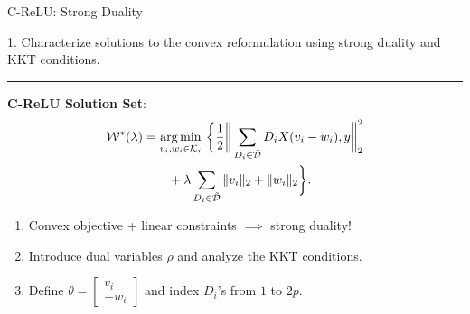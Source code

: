 \documentclass[usenames,dvipsnames,mathserif,notheorems]{beamer}
\newcommand{\horizontalrule}{
	{
			\vspace{-0.5em}
			\center \rule{\textwidth}{0.1em}
			\vspace{-0.2em}
		}
}
\newcommand{\good}[1]{\textcolor{good}{#1}}
\begin{document}
\begin{frame}{C-ReLU: Strong Duality}

	{\raggedright
		\large
		1. Characterize solutions to the \good{convex reformulation}
		using strong duality and KKT conditions.
		\vspace{3ex}
		\pause
	}

	\horizontalrule

	\textbf{C-ReLU Solution Set}:
	\[
		\begin{aligned}
			\mathcal{W}^*(\lambda) & =
			\mathop{\rm arg\,min}_{v_i, w_i \in \mathcal{K}_i} \, \bigg\{
			\frac 1 2 \bigg\|\sum_{D_i \in \tilde {\mathcal{D}}} D_i X (v_i - w_i), y\bigg\|_2^2                    \\
			                & \quad \quad + \lambda\sum_{D_i \in \tilde {\mathcal{D}}}\|v_i\|_2+\|w_i\|_2
			\bigg\}.
		\end{aligned}
	\]

	\pause

	\begin{enumerate}
		\item Convex objective + linear constraints \( \implies \) \good{strong duality}!
		      \pause
		\item Introduce dual variables \( \rho \) and analyze the KKT conditions.
		      \pause
		\item Define
		      \(
		      \theta =
		      \begin{bmatrix}
			      v_i \\
			      -w_i
		      \end{bmatrix}
		      \)
		      and index \( D_i \)'s from \( 1 \) to \( 2p \).
	\end{enumerate}

\end{frame}
\end{document}
